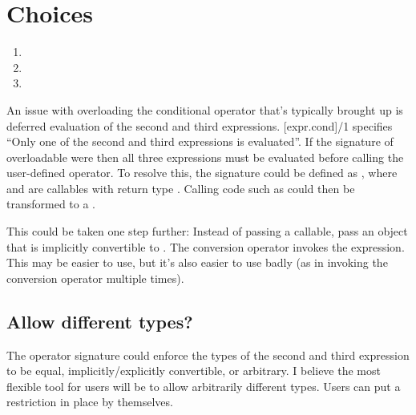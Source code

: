 \section{Choices}
\begin{enumerate}
  \item {}
  \item {}
  \item {}
\end{enumerate}
An issue with overloading the conditional operator that's typically brought up is deferred evaluation of the second and third expressions.
[expr.cond]/1 specifies “Only one of the second and third expressions is evaluated”.
If the signature of overloadable  were  then all three expressions must be evaluated before calling the user-defined operator.
To resolve this, the signature could be defined as , where  and  are callables with return type .
Calling code such as  could then be transformed to a .

This could be taken one step further:
Instead of passing a callable, pass an object that is implicitly convertible to .
The conversion operator invokes the expression.
This may be easier to use, but it's also easier to use badly (as in invoking the conversion operator multiple times).

\subsection{Allow different types?}
The operator signature could enforce the types of the second and third expression to be equal, implicitly/explicitly convertible, or arbitrary.
I believe the most flexible tool for users will be to allow arbitrarily different types.
Users can put a restriction in place by themselves.


